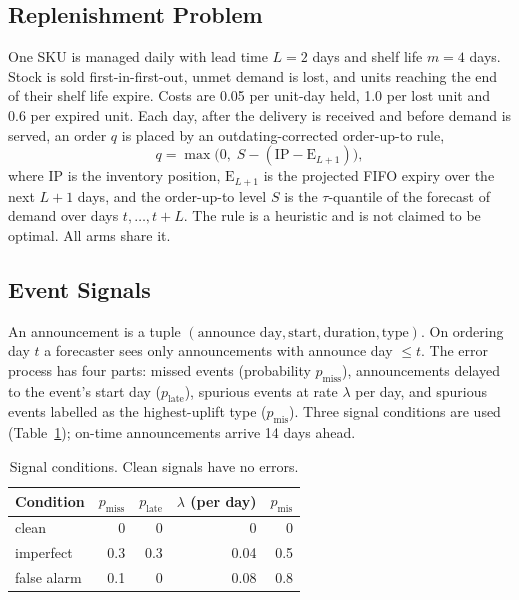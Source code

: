 \subsection{Replenishment Problem}
One SKU is managed daily with lead time $L = 2$ days and shelf life $m = 4$ days. Stock is sold first-in-first-out, unmet demand is lost, and units reaching the end of their shelf life expire. Costs are 0.05 per unit-day held, 1.0 per lost unit and 0.6 per expired unit. Each day, after the delivery is received and before demand is served, an order $q$ is placed by an outdating-corrected order-up-to rule,
\begin{equation}
    q = \max\bigl(0,\; S - (\mathrm{IP} - \mathrm{E}_{L+1})\bigr),
\end{equation}
where $\mathrm{IP}$ is the inventory position, $\mathrm{E}_{L+1}$ is the projected FIFO expiry over the next $L+1$ days, and the order-up-to level $S$ is the $\tau$-quantile of the forecast of demand over days $t,\dots,t+L$. The rule is a heuristic and is not claimed to be optimal. All arms share it.

\subsection{Event Signals}
An announcement is a tuple $(\text{announce day}, \text{start}, \text{duration}, \text{type})$. On ordering day $t$ a forecaster sees only announcements with announce day $\le t$. The error process has four parts: missed events (probability $p_{\text{miss}}$), announcements delayed to the event's start day ($p_{\text{late}}$), spurious events at rate $\lambda$ per day, and spurious events labelled as the highest-uplift type ($p_{\text{mis}}$). Three signal conditions are used (Table~\ref{tab:conditions}); on-time announcements arrive 14 days ahead.

\begin{table}[t]
\centering
\caption{Signal conditions. Clean signals have no errors.}
\label{tab:conditions}
\setlength{\tabcolsep}{4pt}
\footnotesize
\begin{tabular}{@{}lrrrr@{}}
\toprule
\textbf{Condition} & $p_{\text{miss}}$ & $p_{\text{late}}$ & $\lambda$ (per day) & $p_{\text{mis}}$ \\
\midrule
clean       & 0   & 0   & 0    & 0   \\
imperfect   & 0.3 & 0.3 & 0.04 & 0.5 \\
false alarm & 0.1 & 0   & 0.08 & 0.8 \\
\bottomrule
\end{tabular}
\end{table}

